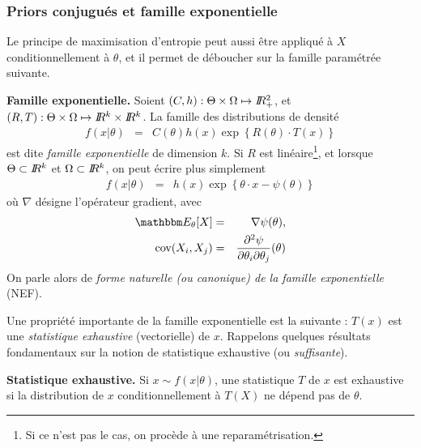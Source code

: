 \if{} \vspace{1cm} 
\fi
\vspace{0.5cm}


\subsubsection{Priors conjugués et famille exponentielle}

Le principe de maximisation d'entropie peut aussi être appliqué à $X$ conditionnellement à $\theta$, et il permet de déboucher sur la famille paramétrée suivante. 

\begin{definition}{\bf Famille exponentielle.}
Soient $(C,h):\Theta\times\Omega \mapsto I\!\!R^2_+$, et $(R,T):\Theta\times\Omega\mapsto I\!\!R^k\times I\!\!R^k$. La famille des distributions de densité 
\begin{eqnarray*}
f(x|\theta) & =  & C(\theta)h(x)\exp\left\{R(\theta)\cdot T(x)\right\}
\end{eqnarray*}
est dite \emph{\it famille exponentielle} de dimension $k$. Si $R$ est linéaire\footnote{Si ce n'est pas le cas, on procède à une reparamétrisation.}, et lorsque $\Theta\subset I\!\!R^k$ et $\Omega\subset I\!\!R^k$, on peut écrire plus simplement 
\begin{eqnarray*}
f(x|\theta) & = & h(x)\exp\left\{\theta\cdot x - \psi(\theta)\right\}
\end{eqnarray*}
où $\nabla$ désigne l'opérateur gradient, avec 
\begin{eqnarray*}
\E_{\theta}[X] & = & \nabla\psi(\theta),  \\
\mbox{cov}(X_i,X_j) & = & \frac{\partial^2 \psi}{\partial\theta_i\partial\theta_j}(\theta)
\end{eqnarray*}
% 
On parle alors de  \emph{\it forme naturelle (ou canonique) de la famille exponentielle} (NEF). 
\end{definition}

Une propriété importante de la famille exponentielle est la suivante : $T(x)$ est une \emph{statistique exhaustive} (vectorielle) de $x$. Rappelons quelques résultats fondamentaux sur la notion de statistique exhaustive (ou \emph{suffisante}).  

\begin{definition}{\bf Statistique exhaustive.}
Si $x\sim f(x|\theta)$, une statistique $T$ de $x$ est {exhaustive} si la distribution de $x$ conditionnellement à $T(X)$ ne dépend pas de $\theta$. 
\end{definition}

